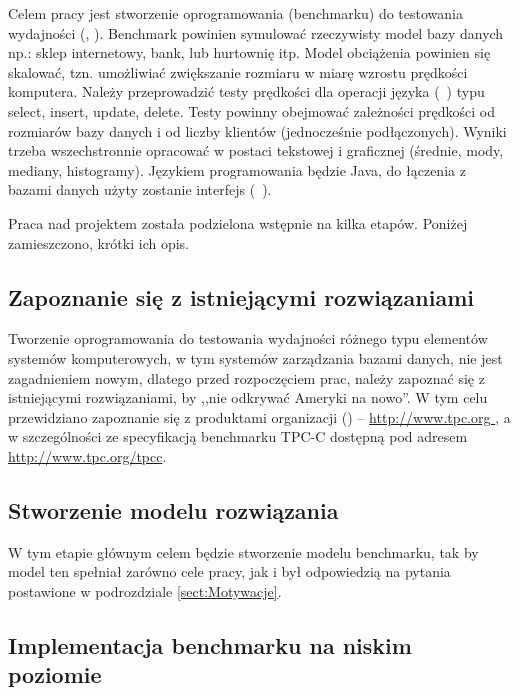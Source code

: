 Celem pracy jest stworzenie oprogramowania (benchmarku) do testowania wydajności
 (, ). 
Benchmark powinien symulować rzeczywisty model bazy danych np.: sklep internetowy, bank, lub hurtownię itp.
Model obciążenia powinien się skalować, tzn. umożliwiać zwiększanie rozmiaru w miarę wzrostu prędkości komputera.
Należy przeprowadzić testy prędkości dla operacji języka  (~\cite{SQL}) typu select, insert, update, delete.
Testy powinny obejmować zależności prędkości od rozmiarów bazy danych i od liczby klientów (jednocześnie podłączonych). 
Wyniki trzeba wszechstronnie opracować w postaci tekstowej i graficznej (średnie, mody, mediany, histogramy).
Językiem programowania będzie Java, do łączenia z bazami danych użyty zostanie interfejs  (~\cite{JDBC1}).

Praca nad projektem została podzielona wstępnie na kilka etapów. Poniżej zamieszczono, krótki ich opis.
\subsection{Zapoznanie się z istniejącymi rozwiązaniami}

Tworzenie oprogramowania do testowania wydajności różnego typu elementów systemów komputerowych,
w tym systemów zarządzania bazami danych, nie jest zagadnieniem nowym, dlatego przed rozpoczęciem prac, 
należy zapoznać się z istniejącymi rozwiązaniami, by ,,nie odkrywać Ameryki na nowo''.
W tym celu przewidziano zapoznanie się z produktami organizacji  () -- \url{http://www.tpc.org } ,
a w szczególności ze specyfikacją benchmarku TPC-C dostępną pod adresem \url{http://www.tpc.org/tpcc}.

\subsection{Stworzenie modelu rozwiązania}

W tym etapie głównym celem będzie stworzenie modelu benchmarku, tak by model ten
spełniał zarówno cele pracy, jak i był odpowiedzią na pytania postawione w podrozdziale \ref{sect:Motywacje}.

\subsection{Implementacja benchmarku na niskim poziomie}


